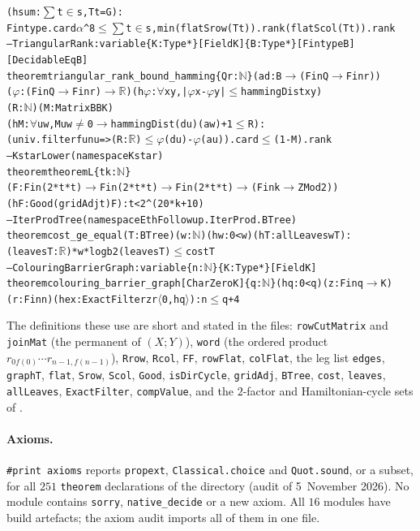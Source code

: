 \documentclass[10pt]{amsart}
\theoremstyle{plain}
\theoremstyle{definition}
\theoremstyle{remark}
\numberwithin{equation}{section}
\begin{document}
\begin{alltt}
    (hsum : \(\sum\) t \(\in\) s, T t = G) :
    Fintype.card \(\alpha\) ^ 8 \(\le\) \(\sum\) t \(\in\) s, min (flat Srow (T t)).rank (flat Scol (T t)).rank
-- TriangularRank: variable \{K : Type*\} [Field K] \{B : Type*\} [Fintype B] [DecidableEq B]
theorem triangular_rank_bound_hamming \{Q r : \(\mathbb{N}\)\} (a d : B \(\to\) (Fin Q \(\to\) Fin r))
    (\(\varphi\) : (Fin Q \(\to\) Fin r) \(\to\) \(\mathbb{R}\)) (h\(\varphi\) : \(\forall\) x y, |\(\varphi\) x - \(\varphi\) y| \(\le\) hammingDist x y)
    (R : \(\mathbb{N}\)) (M : Matrix B B K)
    (hM : \(\forall\) u w, M u w \(\ne\) 0 \(\to\) hammingDist (d u) (a w) + 1 \(\le\) R) :
    (univ.filter fun u => (R : \(\mathbb{R}\)) \(\le\) \(\varphi\) (d u) - \(\varphi\) (a u)).card \(\le\) (1 - M).rank
-- KstarLower (namespace Kstar)
theorem theoremL \{t k : \(\mathbb{N}\)\}
    (F : Fin (2 * t * t) \(\to\) Fin (2 * t * t) \(\to\) Fin (2 * t * t) \(\to\) (Fin k \(\to\) ZMod 2))
    (hF : Good (gridAdj t) F) : t < 2 ^ (20 * k + 10)
-- IterProdTree (namespace EthFollowup.IterProd.BTree)
theorem cost_ge_equal (T : BTree) (w : \(\mathbb{N}\)) (hw : 0 < w) (hT : allLeaves w T) :
    (leaves T : \(\mathbb{R}\)) * w * logb 2 (leaves T) \(\le\) cost T
-- ColouringBarrierGraph: variable \{n : \(\mathbb{N}\)\} \{K : Type*\} [Field K]
theorem colouring_barrier_graph [CharZero K] \{q : \(\mathbb{N}\)\} (hq : 0 < q) (z : Fin q \(\to\) K)
    (r : Fin n) (hex : ExactFilter z r \(\langle\)0, hq\(\rangle\)) : n \(\le\) q + 4
\end{alltt}
The definitions these use are short and stated in the files: \texttt{rowCutMatrix} and
\texttt{joinMat} (the permanent of $(X;Y)$), \texttt{word} (the ordered product
$r_{0f(0)}\cdots r_{n-1,f(n-1)}$), \texttt{Rrow}, \texttt{Rcol}, \texttt{FF}, \texttt{rowFlat},
\texttt{colFlat}, the leg list \texttt{edges}, \texttt{graphT}, \texttt{flat}, \texttt{Srow},
\texttt{Scol}, \texttt{Good}, \texttt{isDirCycle}, \texttt{gridAdj}, \texttt{BTree}, \texttt{cost},
\texttt{leaves}, \texttt{allLeaves}, \texttt{ExactFilter}, \texttt{compValue}, and the $2$-factor and
Hamiltonian-cycle sets of .

\paragraph{Axioms.} \texttt{\#print axioms} reports \texttt{propext}, \texttt{Classical.choice} and
\texttt{Quot.sound}, or a subset, for all $251$ \texttt{theorem} declarations of the directory (audit
of 5~November 2026). No module contains \texttt{sorry}, \texttt{native\_decide} or a new axiom. All
$16$ modules have build artefacts; the axiom audit imports all of them in one file.
\end{document}
